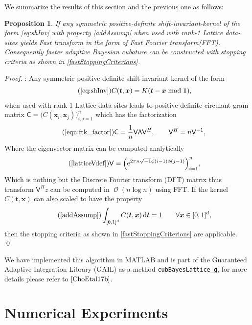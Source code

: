 \documentclass[twocolumn]{svjour3}          %
\DeclareMathOperator{\Order}{{\mathcal O}}
\newtheorem{prop}{Proposition}
\newcommand{\bm}[1]{\boldsymbol{#1}}
\newcommand{\D}[1]{\text{d}{#1}}
\newcommand{\vt}{\bm{t}}
\newcommand{\vx}{\bm{x}}
\newcommand{\vone}{\bm{1}}
\newcommand{\mC}{\mathsf{C}}
\newcommand{\mLambda}{\mathsf{\Lambda}}
\newcommand{\mV}{\mathsf{V}}
\newcommand{\me}{\mathrm{e}}
\newcommand{\code}[1]{\texttt{#1}}
\begin{document}
We summarize the results of this section and the previous one as follows:
\begin{prop}
If any symmetric positive-definite shift-invariant-kernel of the form \eqref{eq:shInv} with  property \eqref{addAssump} when used with rank-1 Lattice data-sites yields Fast transform in the form of \emph{Fast Fourier transform}(FFT). Consequently faster adaptive Bayesian cubature can be constructed with stopping criteria as shown in \eqref{fastStoppingCriterions}.
\end{prop}
\begin{proof}:
	Any symmetric positive-definite shift-invariant-kernel of the form 
	\begin{equation} \tag{\ref{eq:shInv}}
	C(\vt,\vx) = K(\vt - \vx \bmod \vone),
	\end{equation}
	 when used with rank-1 Lattice data-sites leads to positive-definite-circulant gram matrix $\mC = \bigl ( C(\vx_i, \vx_j) \bigr)_{i, j = 1}^n $ which has the factorization
	 \begin{equation}
	 \tag{\ref{eqn:ftk_factor}}
	 \mC = \frac 1n \mV \mLambda \mV^H , 
	 \quad \quad \mV^H = n \mV^{-1}, \\
	 \end{equation}
	 Where the eigenvector matrix can be computed analytically 
	 \begin{equation} \tag{\ref{latticeVdef}}
	 \mV = \Bigl ( \me^{2 \pi n \sqrt{-1} \phi(i-1)\phi(j-1)} \Bigr)_{i = 1}^n,
	 \end{equation}
	 Which is nothing but the Discrete Fourier transform (DFT) matrix thus transform $\mV^H z$ can be computed in $\Order(n \log n)$ using FFT.
	 If the kernel $C(\vt,\vx)$ can also scaled to have the property  
	 \begin{equation} \tag{\ref{addAssump}}
	 \int_{[0,1]^d} C(\vt,\vx) \, \D \vt = 1 \qquad \forall \vx \in [0,1]^d,
	 \end{equation}
	 then the stopping criteria as shown in \eqref{fastStoppingCriterions} are applicable. \qed
\end{proof}

We have implemented this algorithm in MATLAB and is part of the Guaranteed Adaptive Integration Library (GAIL) as a method  \code{cubBayesLattice\_g}, for more details please refer to $\cite{ChoEtal17b}$.

\section{Numerical Experiments}
\end{document}
